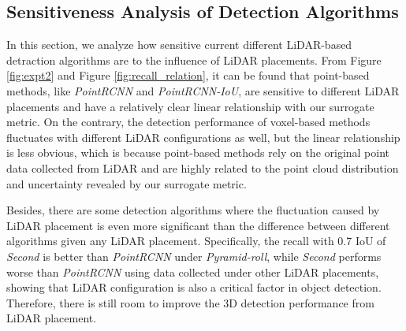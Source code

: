 \documentclass[10pt,twocolumn,letterpaper]{article}
\begin{document}
\subsection{Sensitiveness Analysis of Detection Algorithms}
In this section, we analyze how sensitive current different LiDAR-based detraction algorithms are to the influence of LiDAR placements. From  Figure \ref{fig:expt2} and Figure \ref{fig:recall_relation}, it can be found that point-based methods, like \textit{PointRCNN} and \textit{PointRCNN-IoU}, are sensitive to different LiDAR placements and have a relatively clear linear relationship with our surrogate metric. On the contrary, the detection performance of voxel-based methods fluctuates with different LiDAR configurations as well, but the linear relationship is less obvious, which is because point-based methods rely on the original point data collected from LiDAR and are highly related to the point cloud distribution and uncertainty revealed by our surrogate metric.

Besides, there are some detection algorithms where the fluctuation caused by LiDAR placement is even more significant than the difference between different algorithms given any LiDAR placement. Specifically, the recall with 0.7 IoU of \textit{Second} is better than \textit{PointRCNN} under \textit{Pyramid-roll}, while  \textit{Second} performs worse than \textit{PointRCNN}  using data collected under other LiDAR placements, showing that LiDAR configuration is also a critical factor in object detection. Therefore, there is still room to improve the 3D detection performance from LiDAR placement.
\end{document}

